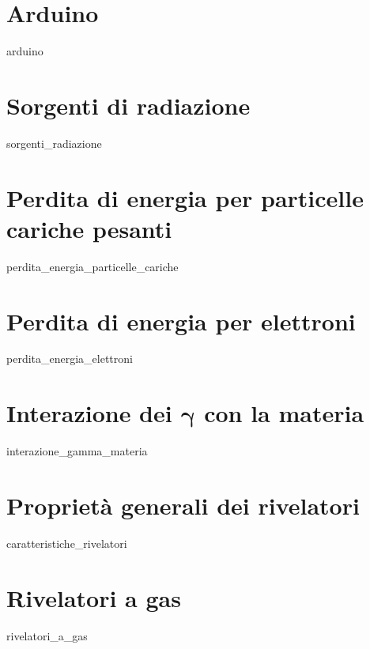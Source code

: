 \documentclass[openany,12pt]{book}
\newcommand{\comment}[1]{}
\begin{document}
\newpage

\pagestyle{fancy}
\fancyhf{}
\fancyhead[LE]{\nouppercase{\textbf{\thepage}\hfill\leftmark}}
\fancyhead[RO]{\nouppercase{\rightmark\hfill\textbf{\thepage}}}


\chapter{Arduino}
{arduino}

\chapter{Sorgenti di radiazione}
{sorgenti_radiazione}

\chapter{Perdita di energia per particelle cariche pesanti}
{perdita_energia_particelle_cariche}

\chapter{Perdita di energia per elettroni}
{perdita_energia_elettroni}

\chapter[Interazione dei \texorpdfstring{$\gamma$}{\textgamma} con la materia]
{Interazione dei $\boldsymbol{\gamma}$ con la materia}
{interazione_gamma_materia}

\chapter{Proprietà generali dei rivelatori}\label{chap:caratteristiche_rivelatori}
{caratteristiche_rivelatori}


\chapter{Rivelatori a gas}
{rivelatori_a_gas}
\end{document}
